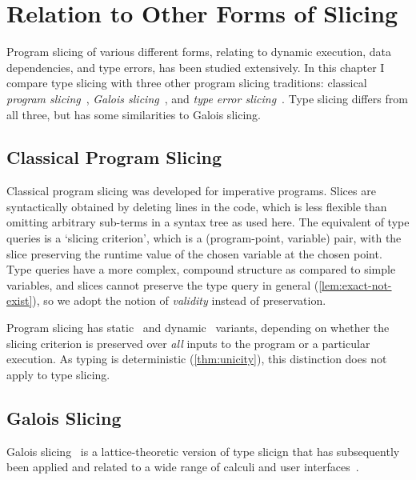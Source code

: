 \section{Relation to Other Forms of Slicing}
\label{sec:comparisons}

Program slicing of various different forms, relating to dynamic execution, data dependencies, and type errors, has been studied extensively. In this chapter I compare type slicing with three other program slicing traditions: classical \emph{program slicing}~\cite{Weiser1984,TipSurvey1995}, \emph{Galois slicing}~\cite{Perera2012}, and \emph{type error slicing}~\cite{Wand1986,HaackWells2003}. Type slicing differs from all three, but has some similarities to Galois slicing.

\subsection{Classical Program Slicing}
\label{sec:cmp-program-slicing}

Classical program slicing \cite{Weiser1984,TipSurvey1995} was developed for imperative programs. Slices are syntactically obtained by deleting lines in the code, which is less flexible than omitting arbitrary sub-terms in a syntax tree as used here. The equivalent of type queries is a `slicing criterion', which is a (program-point, variable) pair, with the slice preserving the runtime value of the chosen variable at the chosen point. Type queries have a more complex, compound structure as compared to simple variables, and slices cannot preserve the type query in general (\cref{lem:exact-not-exist}), so we adopt the notion of \textit{validity} instead of preservation.

Program slicing has static~\cite{Weiser1984} and dynamic~\cite{KorelLaski1988} variants, depending on whether the slicing criterion is preserved over \textit{all} inputs to the program or a particular execution. As typing is deterministic (\cref{thm:unicity}), this distinction does not apply to type slicing.

\subsection{Galois Slicing}
\label{sec:cmp-galois}

Galois slicing~\cite{Perera2012} is a lattice-theoretic version of type slicign that has subsequently been applied and related to a wide range of calculi and user interfaces~\cite{Ricciotti2017,PereraGarg2016,PereraVis2022,AtkeyPerera2025}.

